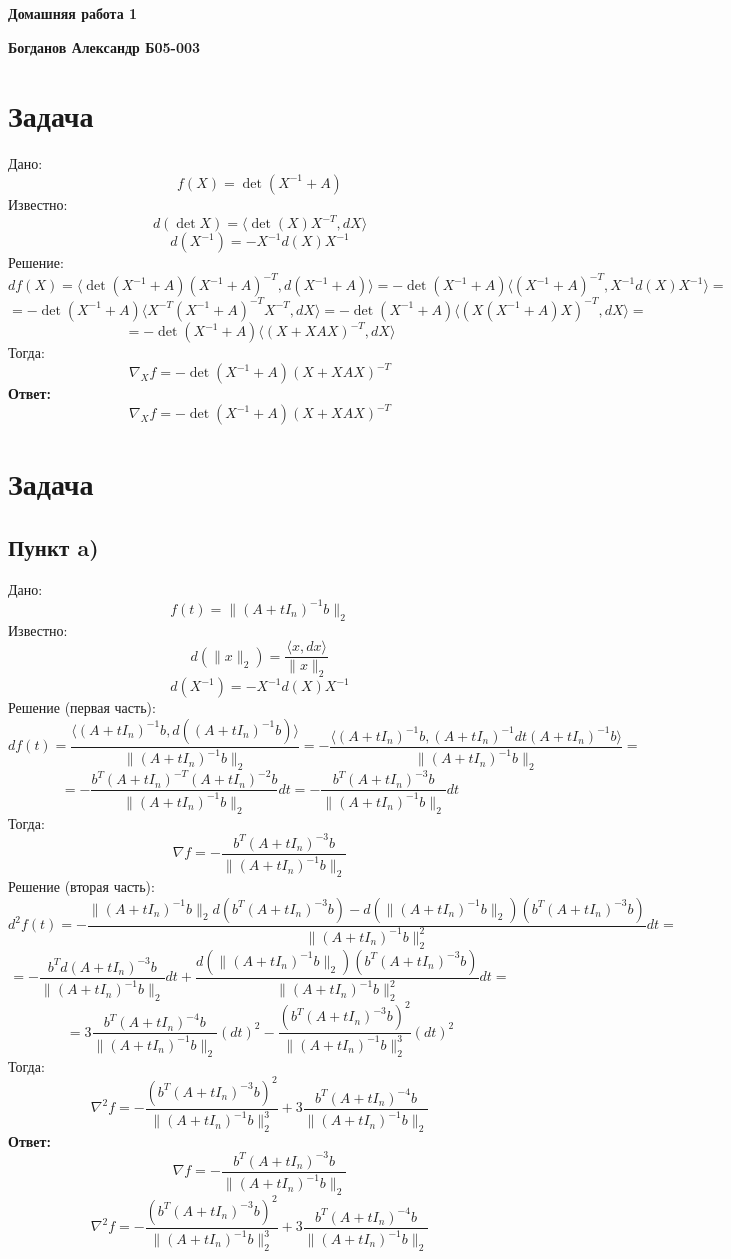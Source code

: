 \documentclass[a4paper,12pt]{article}
\begin{document}
 

\begin{center}
\Large{\textbf{Домашняя работа 1}}

\Large{\textbf{Богданов Александр Б05-003}}
\end{center}

\section{Задача}

Дано:
    \[f(X) = \det (X^{-1} + A)\]
Известно:
    \[d(\det X) = \langle \det (X)X^{-T}, dX \rangle\]
    \[d(X^{-1}) = - X^{-1} d(X) X^{-1}\]
Решение:
    \[df(X) = \langle \det (X^{-1} + A)(X^{-1} + A)^{-T}, d(X^{-1} + A) \rangle = - \det (X^{-1} + A) \langle (X^{-1} + A)^{-T}, X^{-1} d(X) X^{-1} \rangle = \]
    \[= - \det (X^{-1} + A) \langle X^{-T}(X^{-1} + A)^{-T}X^{-T}, dX  \rangle = - \det (X^{-1} + A) \langle (X(X^{-1} + A)X)^{-T}, dX  \rangle = \]
    \[= - \det (X^{-1} + A) \langle (X + XAX)^{-T}, dX  \rangle \]
Тогда:
    \[\nabla_X f = - \det (X^{-1} + A) (X + XAX)^{-T}\]
\textbf{Ответ:}
    \[\nabla_X f = - \det (X^{-1} + A) (X + XAX)^{-T}\]

\section{Задача}

\subsection{Пункт a)}

Дано:
    \[f(t) = \|(A + tI_n)^{-1}b\|_2\]
Известно:
    \[d(\|x\|_2) = \frac{\langle x, dx \rangle}{\|x\|_2}\]
    \[d(X^{-1}) = - X^{-1} d(X) X^{-1}\]
Решение (первая часть):
    \[df(t) = \frac{\langle (A + tI_n)^{-1}b, d((A + tI_n)^{-1}b) \rangle}{\|(A + tI_n)^{-1}b\|_2} = - \frac{\langle (A + tI_n)^{-1}b, (A + tI_n)^{-1}dt(A + tI_n)^{-1}b \rangle}{\|(A + tI_n)^{-1}b\|_2} = \]
    \[= - \frac{b^T(A + tI_n)^{-T}(A + tI_n)^{-2}b}{\|(A + tI_n)^{-1}b\|_2} dt = - \frac{b^T(A + tI_n)^{-3}b}{\|(A + tI_n)^{-1}b\|_2} dt\]
Тогда:
    \[\nabla f = - \frac{b^T(A + tI_n)^{-3}b}{\|(A + tI_n)^{-1}b\|_2}\]
Решение (вторая часть):
    \[d^2f(t) = - \frac{\|(A + tI_n)^{-1}b\|_2 d(b^T(A + tI_n)^{-3}b) - d(\|(A + tI_n)^{-1}b\|_2)(b^T(A + tI_n)^{-3}b)}{\|(A + tI_n)^{-1}b\|_2^2} dt = \]
    \[= - \frac{b^Td(A + tI_n)^{-3}b}{\|(A + tI_n)^{-1}b\|_2} dt + \frac{d(\|(A + tI_n)^{-1}b\|_2)(b^T(A + tI_n)^{-3}b)}{\|(A + tI_n)^{-1}b\|_2^2} dt = \]
    \[= 3 \frac{b^T(A + tI_n)^{-4}b}{\|(A + tI_n)^{-1}b\|_2} (dt)^2 - \frac{(b^T(A + tI_n)^{-3}b)^2}{\|(A + tI_n)^{-1}b\|_2^3} (dt)^2\]
Тогда:
    \[\nabla^2f = - \frac{(b^T(A + tI_n)^{-3}b)^2}{\|(A + tI_n)^{-1}b\|_2^3} + 3 \frac{b^T(A + tI_n)^{-4}b}{\|(A + tI_n)^{-1}b\|_2}\]
\textbf{Ответ:}
    \[\nabla f = - \frac{b^T(A + tI_n)^{-3}b}{\|(A + tI_n)^{-1}b\|_2}\]
    \[\nabla^2f = - \frac{(b^T(A + tI_n)^{-3}b)^2}{\|(A + tI_n)^{-1}b\|_2^3} + 3 \frac{b^T(A + tI_n)^{-4}b}{\|(A + tI_n)^{-1}b\|_2}\]
    
\end{document}

